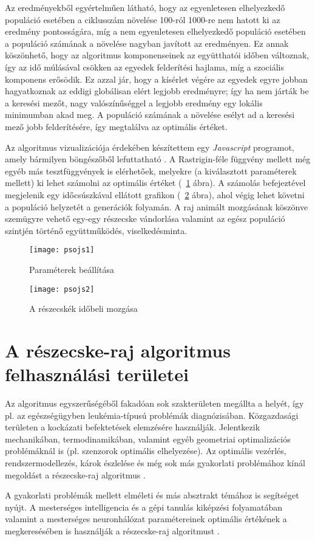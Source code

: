 Az eredményekből egyértelműen látható, hogy az egyenletesen elhelyezkedő populáció esetében a ciklusszám növelése 100-ról 1000-re nem hatott ki az eredmény pontosságára, míg a nem egyenletesen elhelyezkedő populáció esetében a populáció számának a növelése nagyban javított az eredményen. Ez annak köszönhető, hogy az algoritmus komponenseinek az együtthatói időben változnak, így az idő múlásával csökken az egyedek felderítési hajlama, míg a szociális komponens erősödik. Ez azzal jár, hogy a kísérlet végére az egyedek egyre jobban hagyatkoznak az eddigi globálisan elért legjobb eredményre; így ha nem járták be a keresési mezőt, nagy valószínűséggel a legjobb eredmény egy lokális minimumban akad meg. A populáció számának a növelése esélyt ad a keresési mező jobb felderítésére, így megtalálva az optimális értéket.

Az algoritmus vizualizációja érdekében készítettem egy \textit{Javascript} programot, amely bármilyen böngészőből lefuttatható \parencite{kissjs2020}. A Rastrigin-féle függvény mellett még egyéb más tesztfüggvények is elérhetőek, melyekre (a kiválasztott paraméterek mellett) ki lehet számolni az optimális értéket (~\ref{fig:psojs1} ábra). A számolás befejeztével megjelenik egy időcsúszkával ellátott grafikon (~\ref{fig:psojs2} ábra), ahol végig lehet követni a populáció helyzetét a generációk folyamán. A raj animált mozgásának köszönve szemügyre vehető egy-egy részecske vándorlása valamint az egész populáció szintjén történő együttműködés, viselkedésminta.

\begin{figure}
    \centering
    \texttt{[image: psojs1]}
    \caption{Paraméterek beállítása}
    \label{fig:psojs1}
\end{figure}

\begin{figure}
    \centering
    \texttt{[image: psojs2]}
    \caption{A részecskék időbeli mozgása}
    \label{fig:psojs2}
\end{figure}

\section{A részecske-raj algoritmus felhasználási területei}

Az algoritmus egyszerűségéből fakadóan sok szakterületen megállta a helyét, így pl. az egészségügyben leukémia-típusú problémák diagnózisában. Közgazdasági területen a kockázati befektetések elemzésére használják. Jelentkezik mechanikában, termodinamikában, valamint egyéb geometriai optimalizációs problémáknál is (pl. szenzorok optimális elhelyezése). Az optimális vezérlés, rendszermodellezés, károk észlelése és még sok más gyakorlati problémához kínál megoldást a részecske-raj algoritmus \parencite{almeida2019}.

A gyakorlati problémák mellett elméleti és más absztrakt témához is segítséget nyújt. A mesterséges intelligencia és a gépi tanulás kiképzési folyamatában valamint a mesterséges neuronhálózat paramétereinek optimális értékének a megkeresésében is használják a részecske-raj algoritmust \parencite{kanovic2017}.

